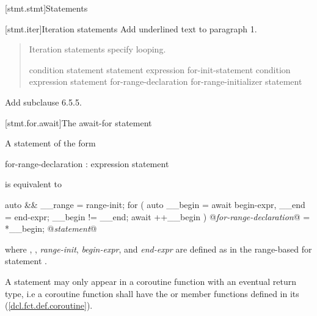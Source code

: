 
[stmt.stmt]{Statements}%

\setcounter{section}{4}
[stmt.iter]{Iteration statements}%
Add underlined text to paragraph 1.

\begin{quote}
\pnum
Iteration statements specify looping.

%
%
%
%
\begin{bnf}
	\br
	 condition \terminal{)} statement\br
	 statement  expression \terminal{) ;}\br
	 for-init-statement condition\opt \terminal{;} expression\opt \terminal{)} statement\br
	 for-range-declaration \terminal{:} for-range-initializer \terminal{)} statement\br
\end{bnf}
\end{quote}

Add subclause 6.5.5.

\setcounter{subsection}{4}
[stmt.for.await]{The await-for statement}%

\pnum
A  statement of the form

\begin{ncbnf}
	 for-range-declaration : expression \terminal{)} statement
\end{ncbnf}

is equivalent to

\begin{codeblock}
	{
		auto && __range = range-init;
		for ( auto __begin = await begin-expr,
		__end = end-expr;
		__begin != __end;
		await ++__begin ) {
			@\textit{for-range-declaration}@ = *__begin;
			@\textit{statement}@
		}
	}
\end{codeblock}

where , , 
\textit{range-init}, \textit{begin-expr}, and \textit{end-expr} are defined as in the range-based for statement .

\pnum
A  statement may only appear in a coroutine function 
with an eventual return type, i.e a coroutine function shall have the  or  member
functions defined in its  (\ref{dcl.fct.def.coroutine}).

